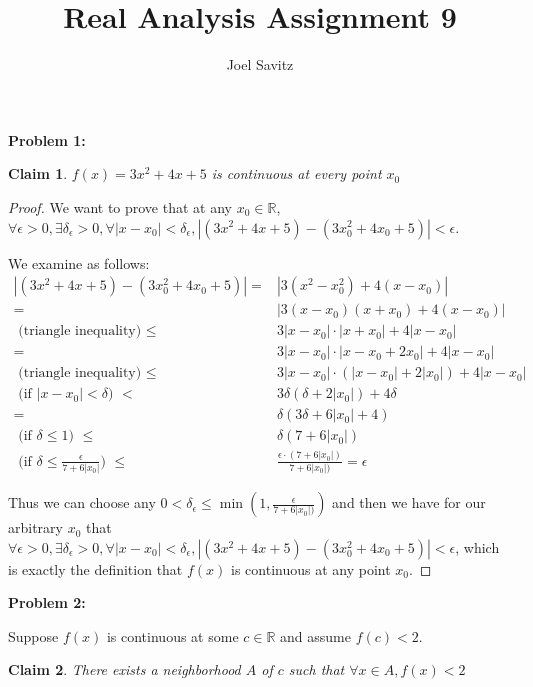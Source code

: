 \documentclass{article}
\title{Real Analysis Assignment 9}
\author{Joel Savitz}
\newcommand{\reals}{\ensuremath{\mathbb{R}}}
\newcommand{\eps}{\ensuremath{\epsilon}}
\newcommand{\pt}[1]{\textrm{ #1 }}
\newtheorem{clm}{Claim}
\begin{document}
\maketitle

\textbf{Problem 1:}

\begin{clm}
	$f(x) = 3x^2 + 4x + 5$ is continuous at every point $x_0$
\end{clm}

\begin{proof}
	We want to prove that at any $x_0 \in \reals$,
	$\forall \eps > 0, \exists \delta_\eps > 0, \forall |x - x_0| < \delta_\eps, |(3x^2 + 4x + 5) - (3x_0^2 + 4x_0 + 5)| < \eps$.

	We examine as follows:
	\begin{align}
		|(3x^2 + 4x + 5) - (3x_0^2 + 4x_0 + 5)| = & |3(x^2 - x_0^2) + 4(x - x_0)| \\
		= & |3(x-x_0)(x+x_0) + 4(x - x_0)| \\
		\pt{(triangle inequality)}\le & 3|x-x_0|\cdot|x+x_0| + 4|x - x_0| \\
		= & 3|x-x_0|\cdot|x-x_0 + 2x_0| + 4|x - x_0| \\
		\pt{(triangle inequality)}\le & 3|x-x_0|\cdot(|x-x_0| + 2|x_0|) + 4|x - x_0| \\
		\pt{(if $|x - x_0| < \delta$)} < & 3\delta(\delta + 2|x_0|) + 4\delta \\
		= & \delta(3\delta + 6|x_0| + 4) \\
		\pt{(if $\delta \le 1$)} \le & \delta(7 + 6|x_0|) \\
		\pt{(if $\delta \le \frac{\eps}{7 + 6|x_0|}$)} \le &\frac{\eps \cdot (7 + 6|x_0|)}{7 + 6|x_0|)} = \eps
	\end{align}

	Thus we can choose any $0 < \delta_\eps \le \min(1, \frac{\eps}{7 + 6|x_0|)})$
	and then we have for our arbitrary $x_0$
	that $\forall \eps > 0,
	\exists \delta_\eps > 0,
	\forall |x - x_0| < \delta_\eps,
	|(3x^2 + 4x + 5) - (3x_0^2 + 4x_0 + 5)| < \eps$,
	which is exactly the definition that $f(x)$
	is continuous at any point $x_0$.
\end{proof}

\textbf{Problem 2:}

Suppose $f(x)$ is continuous at some $c \in \reals$ and assume $f(c) < 2$.

\begin{clm}
	There exists a neighborhood $A$ of $c$ such that $\forall x \in A, f(x) < 2$
\end{clm}
\end{document}
